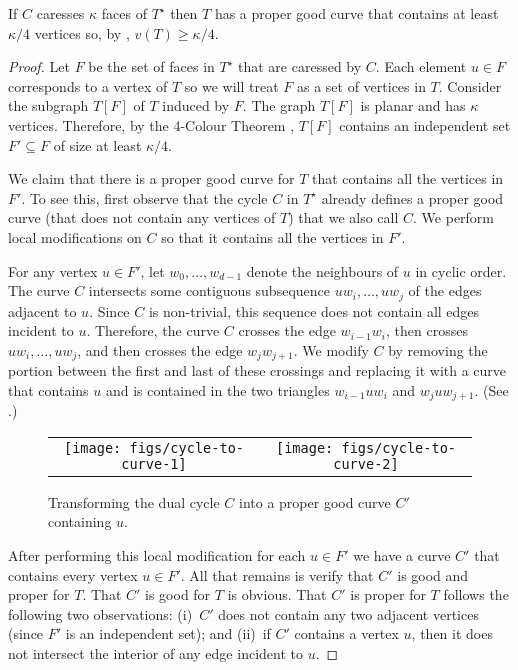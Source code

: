 \documentclass{patmorin}
\newcommand{\dual}[1]{{#1}^\star}
\begin{document}
\begin{lem}
   If $C$ caresses $\kappa$ faces of $\dual{T}$ then $T$ has a proper
   good curve that contains at least $\kappa/4$ vertices so, by
   , $v(T)\ge \kappa/4$.
\end{lem}

\begin{proof}
  Let $F$ be the set of faces in $\dual{T}$ that are caressed by $C$. Each
  element $u\in F$ corresponds to a vertex of $T$ so we will treat $F$ as
  a set of vertices in $T$.  Consider the subgraph $T[F]$ of $T$ induced
  by $F$.  The graph $T[F]$ is planar and has $\kappa$ vertices. Therefore,
  by the 4-Colour Theorem \cite{robertson.seymour.ea:four-colour}, $T[F]$
  contains an independent set $F'\subseteq F$ of size at least $\kappa/4$.

  We claim that there is a proper good curve for $T$ that contains all
  the vertices in $F'$.  To see this, first observe that the cycle $C$ in
  $\dual{T}$ already defines a proper good curve (that does not contain
  any vertices of $T$) that we also call $C$.  We perform
  local modifications on $C$ so that it contains all the vertices in $F'$.

  For any vertex $u\in F'$, let $w_0,\ldots,w_{d-1}$ denote the neighbours
  of $u$ in cyclic order.  The curve $C$ intersects some contiguous
  subsequence $uw_i,\ldots,uw_j$ of the edges adjacent to $u$.  Since $C$
  is non-trivial, this sequence does not contain all edges incident
  to $u$. Therefore, the curve $C$ crosses the edge $w_{i-1}w_i$, then
  crosses $uw_i,\ldots,uw_j$, and then crosses the edge $w_j w_{j+1}$.
  We modify $C$ by removing the portion between the first and last of
  these crossings and replacing it with a curve that contains $u$ and is
  contained in the two triangles $w_{i-1}uw_i$ and $w_juw_{j+1}$. (See
  .)

  \begin{figure}
     \begin{center}
	\begin{tabular}{cc}
		\texttt{[image: figs/cycle-to-curve-1]} &
		\texttt{[image: figs/cycle-to-curve-2]}
	\end{tabular}
     \end{center}
     \caption{Transforming the dual cycle $C$ into a proper good curve $C'$ containing $u$.}
  \end{figure}

  After performing this local modification for each $u\in F'$ we have
  a curve $C'$ that contains every vertex $u\in F'$.  All that remains
  is verify that $C'$ is good and proper for $T$. That $C'$ is good for
  $T$ is obvious.  That $C'$ is proper for $T$ follows the following two
  observations: (i)~$C'$ does not contain any two adjacent vertices (since
  $F'$ is an independent set); and (ii)~if $C'$ contains a vertex $u$,
  then it does not intersect the interior of any edge incident to $u$.
\end{proof}
\end{document}
